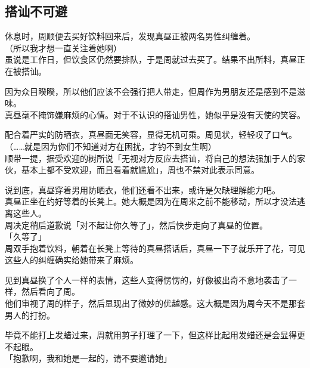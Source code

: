 \subsection{搭讪不可避}

休息时，周顺便去买好饮料回来后，发现真昼正被两名男性纠缠着。\\

（所以我才想一直关注着她啊）\\

虽说是工作日，但饮食区仍然要排队，于是周就过去买了。结果不出所料，真昼正在被搭讪。

因为众目睽睽，所以他们应该不会强行把人带走，但周作为男朋友还是感到不是滋味。\\

真昼毫不掩饰嫌麻烦的心情。对于不认识的搭讪男性，她似乎是没有天使的笑容。

配合着严实的防晒衣，真昼面无笑容，显得无机可乘。周见状，轻轻叹了口气。\\

（……就是因为你们不知道对方在困扰，才钓不到女生啊）\\

顺带一提，据受欢迎的树所说「无视对方反应去搭讪，将自己的想法强加于人的家伙，基本上都不受欢迎，而且看着就尴尬」，周也不禁对此表示同意。

说到底，真昼穿着男用防晒衣，他们还看不出来，或许是欠缺理解能力吧。\\

真昼正坐在约好等着的长凳上。她大概是因为在周来之前不能移动，所以才没法逃离这些人。\\

周决定稍后道歉说「对不起让你久等了」，然后快步走向了真昼的位置。\\

「久等了」\\

周双手抱着饮料，朝着在长凳上等待的真昼搭话后，真昼一下子就乐开了花，可见这些人的纠缠确实给她带来了麻烦。

见到真昼换了个人一样的表情，这些人变得愣愣的，好像被出奇不意地袭击了一样，然后看向了周。\\

他们审视了周的样子，然后显现出了微妙的优越感。这大概是因为周今天不是那套男人的打扮。

毕竟不能打上发蜡过来，周就用剪子打理了一下，但这样比起用发蜡还是会显得更不起眼。\\

「抱歉啊，我和她是一起的，请不要邀请她」\\

